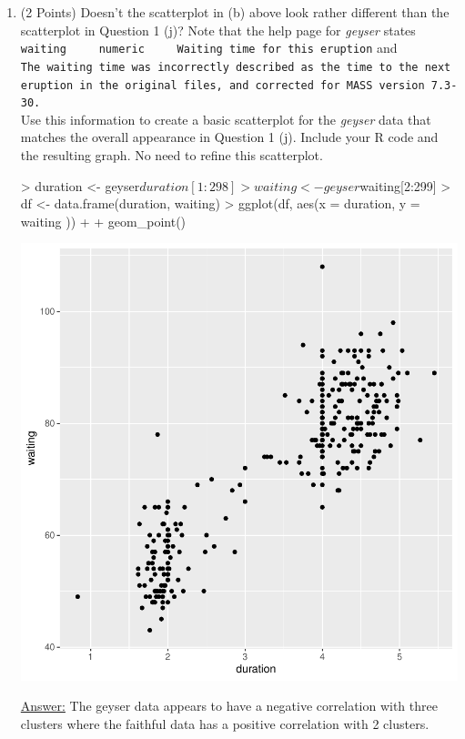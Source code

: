 \documentclass[12pt,letterpaper,final]{article}
\begin{document}
\begin{enumerate}
\begin{enumerate}
\newpage


\item (2 Points) Doesn't the scatterplot in (b) above look rather different 
than the scatterplot in Question 1 (j)? Note that the help page for {\it geyser}
states \verb|waiting	 numeric	 Waiting time for this eruption| and \\
\verb|The waiting time was incorrectly described as the time to the next|
\verb|eruption in the original files, and corrected for MASS version 7.3-30.| \\
Use this information to create a basic scatterplot 
for the {\it geyser} data that matches the overall 
appearance in Question 1 (j). 
Include your R code and the resulting graph.
No need to refine this scatterplot.

\begin{Schunk}
\begin{Sinput}
> duration <- geyser$duration[1:298]
> waiting <- geyser$waiting[2:299]
> df <- data.frame(duration, waiting)
> ggplot(df, aes(x = duration, y = waiting )) + 
+          geom_point()
\end{Sinput}
\end{Schunk}
\includegraphics{rnw_example-018}

\underline{Answer:} 
The geyser data appears to have a negative correlation with three clusters where the faithful data has a positive correlation with 2 clusters.


\end{enumerate}

\end{enumerate}
\end{document}
